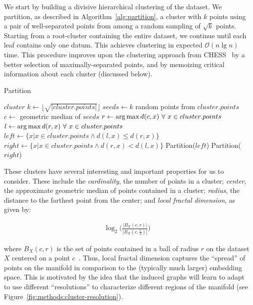 We start by building a divisive hierarchical clustering of the dataset.
We partition, as described in Algorithm~\ref{alg:partition}, a cluster with $k$ points using a pair of well-separated points from among a random sampling of $\sqrt k$ points.
Starting from a root-cluster containing the entire dataset, we continue until each leaf contains only one datum.
This achieves clustering in expected $\mathcal{O}(n \lg n)$ time.
This procedure improves upon the clustering approach from CHESS~\cite{ishaq2019clustered} by a better selection of maximally-separated points, and by memoizing critical information about each cluster (discussed below).

\begin{algorithm} %
\caption{Partition} %
\label{alg:partition} %
\begin{algorithmic}[1] %
    \REQUIRE $cluster$
    \STATE $k \leftarrow \lfloor \sqrt{|cluster.points|} \rfloor$
    \STATE $seeds \leftarrow k$ random points from $cluster.points$
    \STATE $c \leftarrow$ geometric median of $seeds$
    \STATE $r \leftarrow \operatorname*{arg\,max} d(c,x) \ \forall \ x \in cluster.points$
    \STATE $l \leftarrow \operatorname*{arg\,max} d(r,x) \ \forall \ x \in cluster.points$
    \STATE $left \leftarrow \{x | x \in cluster.points \land d(l,x) \le d(r,x)\}$
    \STATE $right \leftarrow \{x | x \in cluster.points \land d(r,x) < d(l,x)\}$
        \STATE Partition($left$)
    \ENDIF
        \STATE Partition($right$)
    \ENDIF
\end{algorithmic}
\end{algorithm}

These clusters have several interesting and important properties for us to consider.
These include the \textit{cardinality}, the number of points in a cluster;
\textit{center}, the approximate geometric median of points contained in a cluster;
\textit{radius}, the distance to the farthest point from the center;
and \textit{local fractal dimension},
as given by:

\begin{gather}
    \log_2\bigg(\frac{|B_X(c, r)|}{|B_X(c, \frac{r}{2})|}\bigg)
    \label{fractal-dimension}
\end{gather}

where $B_X(c,r)$ is the set of points contained in a ball of radius $r$ on the dataset $X$ centered on a point $c$~\cite{ishaq2019clustered}.
Thus, local fractal dimension captures the ``spread'' of points on the manifold in comparison to the (typically much larger) embedding space.
This is motivated by the idea that the induced graphs will learn to adapt to use different ``resolutions'' to characterize different regions of the manifold (see Figure~\ref{fig:methods:cluster-resolution}).


